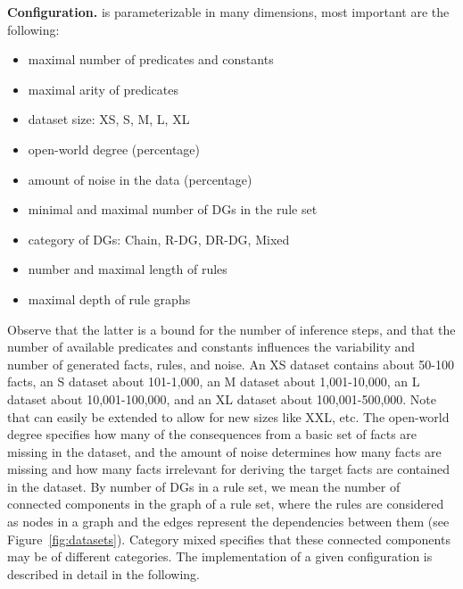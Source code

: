 \textbf{Configuration.} \tool is parameterizable in many dimensions, most important are the following:
\begin{itemize}
\item maximal number of predicates and constants
\item maximal arity of predicates
\item dataset size: XS, S, M, L, XL
\item open-world degree \nowa (percentage) %
\item amount of noise in the data \nnoise (percentage) %
\item minimal and maximal number of DGs in the rule set
\item category of DGs: Chain, R-DG, DR-DG, Mixed
\item number and maximal length of rules
\item maximal depth of rule graphs
\end{itemize}
Observe that the latter is a bound for the number of inference steps, and that the number of available predicates and constants influences the variability and number of generated facts, rules, and noise.
An XS dataset contains about 50-100 facts, 
an S dataset about 101-1,000, 
an M dataset about 1,001-10,000,
an L dataset about 10,001-100,000,
and an XL dataset about 100,001-500,000. Note that \tool can easily be extended to allow for new sizes like XXL, etc.
The open-world degree specifies how many of the consequences from a basic set of {\support facts} are missing in the dataset,
and the amount of noise determines how many \support facts are missing and how many facts irrelevant for deriving the target facts are contained in the dataset.
By number of DGs in a rule set, we mean the number of connected components in the graph of a rule set, where the rules are considered as nodes in a graph and the edges represent the dependencies between them (see Figure~\ref{fig:datasets}).
Category mixed specifies that these connected components may be of different categories.
The implementation of a given configuration is described in detail in the following.

